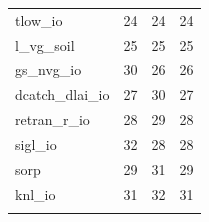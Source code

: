 \documentclass[gmd, manuscript]{copernicus}
\begin{document}
\begin{table}[t]
\begin{tabular}{l r r r}
tlow\_io          &          24   &   24    &   24 \\
l\_vg\_soil        &          25   &   25    &   25 \\
gs\_nvg\_io        &          30    &  26    &   26 \\
dcatch\_dlai\_io    &         27     & 30     &  27 \\
retran\_r\_io       &         28    &  29    &   28 \\
sigl\_io          &          32    &  28    &   28 \\
sorp             &         29     & 31     &  29 \\
knl\_io             &        31    &  32    &   31 \\

\bottomhline
\end{tabular}
\belowtable{} %

\end{table}
\end{document}
